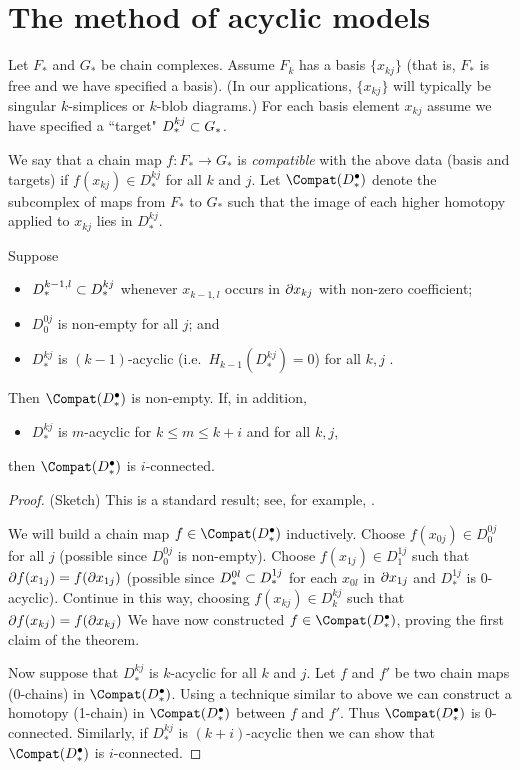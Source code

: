 
\section{The method of acyclic models}  \label{sec:moam}

Let $F_*$ and $G_*$ be chain complexes.
Assume $F_k$ has a basis $\{x_{kj}\}$
(that is, $F_*$ is free and we have specified a basis).
(In our applications, $\{x_{kj}\}$ will typically be singular $k$-simplices or 
$k$-blob diagrams.)
For each basis element $x_{kj}$ assume we have specified a ``target" $D^{kj}_*\subset G_*$.

We say that a chain map $f:F_*\to G_*$ is {\it compatible} with the above data (basis and targets)
if $f(x_{kj})\in D^{kj}_*$ for all $k$ and $j$.
Let $\Compat(D^\bullet_*)$ denote the subcomplex of maps from $F_*$ to $G_*$
such that the image of each higher homotopy applied to $x_{kj}$ lies in $D^{kj}_*$.

\begin{thm}  \label{moam-thm}
Suppose 
\begin{itemize}
\item $D^{k-1,l}_* \subset D^{kj}_*$ whenever $x_{k-1,l}$ occurs in $\partial x_{kj}$
with non-zero coefficient;
\item $D^{0j}_0$ is non-empty for all $j$; and
\item $D^{kj}_*$ is $(k{-}1)$-acyclic (i.e.\ $H_{k-1}(D^{kj}_*) = 0$) for all $k,j$ .
\end{itemize}
Then $\Compat(D^\bullet_*)$ is non-empty.
If, in addition,
\begin{itemize}
\item $D^{kj}_*$ is $m$-acyclic for $k\le m \le k+i$ and for all $k,j$,
\end{itemize}
then $\Compat(D^\bullet_*)$ is $i$-connected.
\end{thm}

\begin{proof}
(Sketch)
This is a standard result; see, for example, \cite[Chapter 4]{MR0210112}.

We will build a chain map $f\in \Compat(D^\bullet_*)$ inductively.
Choose $f(x_{0j})\in D^{0j}_0$ for all $j$
(possible since $D^{0j}_0$ is non-empty).
Choose $f(x_{1j})\in D^{1j}_1$ such that $\partial f(x_{1j}) = f(\partial x_{1j})$
(possible since $D^{0l}_* \subset D^{1j}_*$ for each $x_{0l}$ in $\partial x_{1j}$
and $D^{1j}_*$ is 0-acyclic).
Continue in this way, choosing $f(x_{kj})\in D^{kj}_k$ such that $\partial f(x_{kj}) = f(\partial x_{kj})$
We have now constructed $f\in \Compat(D^\bullet_*)$, proving the first claim of the theorem.

Now suppose that $D^{kj}_*$ is $k$-acyclic for all $k$ and $j$.
Let $f$ and $f'$ be two chain maps (0-chains) in $\Compat(D^\bullet_*)$.
Using a technique similar to above we can construct a homotopy (1-chain) in $\Compat(D^\bullet_*)$
between $f$ and $f'$.
Thus $\Compat(D^\bullet_*)$ is 0-connected.
Similarly, if $D^{kj}_*$ is $(k{+}i)$-acyclic then we can show that $\Compat(D^\bullet_*)$ is $i$-connected.
\end{proof}

